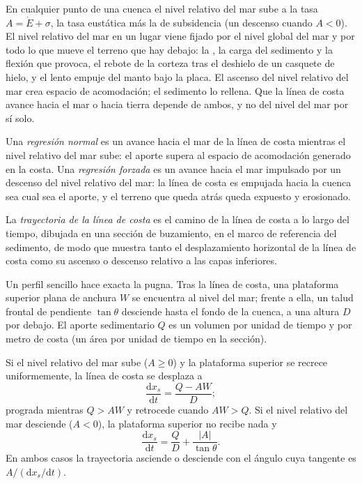 En cualquier punto de una cuenca el nivel relativo del mar sube a la tasa $A = \dot E
+ \sigma$, la tasa eustática más la de subsidencia (un descenso cuando $A < 0$).
El nivel relativo del mar en un lugar viene fijado por el nivel global del mar y por
todo lo que mueve el terreno que hay debajo: la , la carga del
sedimento y la flexión que provoca, el rebote de la corteza tras el
deshielo de un casquete de hielo, y el lento empuje del manto bajo la placa.
El ascenso del nivel relativo del mar crea espacio de acomodación; el sedimento lo rellena. Que la
línea de costa avance hacia el mar o hacia tierra depende de ambos, y no del nivel del mar
por sí solo.

\begin{definition}\label{def:b3:sequence-stratigraphy:regression}
Una \emph{regresión normal} es un avance hacia el mar de la
línea de costa mientras el nivel relativo del mar sube: el aporte supera al
espacio de acomodación generado en la costa. Una \emph{regresión forzada}
es un avance hacia el mar impulsado por un descenso del nivel relativo del mar: la
línea de costa es empujada hacia la cuenca sea cual sea el aporte, y el terreno que queda
atrás queda expuesto y erosionado.
\end{definition}

\begin{definition}\label{def:b3:sequence-stratigraphy:trajectory}
La \emph{trayectoria de la línea de costa} es el camino de
la línea de costa a lo largo del tiempo, dibujada en una sección de buzamiento, en el marco de referencia del
sedimento, de modo que muestra tanto el desplazamiento horizontal de la línea de costa como su
ascenso o descenso relativo a las capas inferiores.
\end{definition}

Un perfil sencillo hace exacta la pugna. Tras la línea de costa, una plataforma superior plana
de anchura $W$ se encuentra al nivel del mar; frente a ella, un talud frontal de pendiente
$\tan\theta$ desciende hasta el fondo de la cuenca, a una altura $D$ por debajo. El aporte
sedimentario $Q$ es un volumen por unidad de tiempo y por metro de costa (un área por
unidad de tiempo en la sección).

\begin{proposition}\label{prop:b3:sequence-stratigraphy:trajectory}
Si el nivel relativo del mar sube ($A \ge 0$) y la plataforma superior se recrece
uniformemente, la línea de costa se desplaza a
\[
\frac{\mathrm dx_s}{\mathrm dt} = \frac{Q - AW}{D};
\]
prograda mientras $Q > AW$ y retrocede cuando $AW > Q$. Si el nivel relativo del mar
desciende ($A < 0$), la plataforma superior no recibe nada y
\[
\frac{\mathrm dx_s}{\mathrm dt} = \frac{Q}{D} + \frac{|A|}{\tan\theta}.
\]
En ambos casos la trayectoria asciende o desciende con el ángulo cuya tangente es
$A/(\mathrm dx_s/\mathrm dt)$.
\end{proposition}

